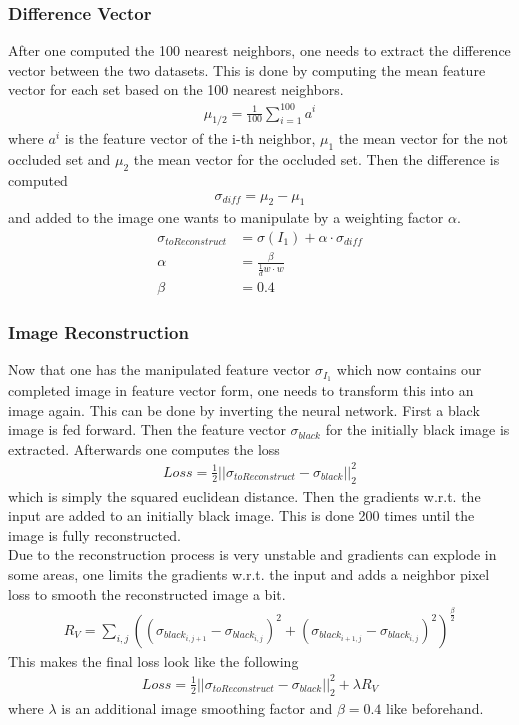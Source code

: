 \documentclass[
     11pt,         %
     a4paper,      %
     oneside,
     ]{article}
\begin{document}
\subsubsection{Difference Vector}
After one computed the 100 nearest neighbors, one needs to extract the difference vector between the two datasets.
This is done by computing the mean feature vector for each set based on the 100 nearest neighbors.
\begin{align*}
  \mu_{1/2} = \frac{1}{100} \sum^{100}_{i=1} a^i
\end{align*}
where $a^i$ is the feature vector of the i-th neighbor, $\mu_1$ the mean vector for the not occluded set and $\mu_2$ the mean vector for the occluded set.
Then the difference is computed
\begin{align*}
  \sigma_{diff} = \mu_2 - \mu_1
\end{align*}
and added to the image one wants to manipulate by a weighting factor $\alpha$.
\begin{align*}
  \sigma_{toReconstruct} &= \sigma (I_1) + \alpha \cdot \sigma_{diff}\\
  \alpha &= \frac{\beta}{\frac{1}{d} w \cdot w}\\
  \beta &= 0.4
\end{align*}\cite{DFI}
\subsubsection{Image Reconstruction}
Now that one has the manipulated feature vector $\sigma_{I_1}$ which now contains our completed image in feature vector form, one needs to transform this into an image again. This can be done by inverting the neural network. First a black image is fed forward. Then the feature vector $\sigma_{black}$ for the initially black image is extracted. Afterwards one computes the loss
\begin{align*}
  Loss = \frac{1}{2} ||\sigma_{toReconstruct} - \sigma_{black}||_2^2
\end{align*}
which is simply the squared euclidean distance.
Then the gradients w.r.t. the input are added to an initially black image. This is done 200 times until the image is fully reconstructed. \\
Due to the reconstruction process is very unstable and gradients can explode in some areas, one limits the gradients w.r.t. the input and adds a neighbor pixel loss to smooth the reconstructed image a bit.
\begin{align*}
  R_V = \sum_{i,j} ((\sigma_{black_{i,j+1}} - \sigma_{black_{i,j}})^2 + (\sigma_{black_{i+1,j}} - \sigma_{black_{i,j}})^2)^{\frac{\beta}{2}}
\end{align*}
This makes the final loss look like the following
\begin{align*}
  Loss = \frac{1}{2} ||\sigma_{toReconstruct} - \sigma_{black}||_2^2 + \lambda R_V
\end{align*}
where $\lambda$ is an additional image smoothing factor and $\beta = 0.4$ like beforehand.\cite{DFI}
\end{document}
